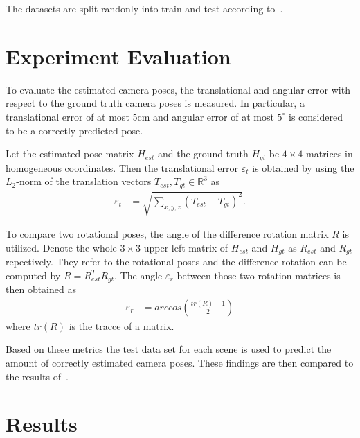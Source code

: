 \documentclass[final]{cvpr}
\begin{document}
The datasets are split randonly into train and test according to~\cite[Table 1]{shotton2013}. 

\section{Experiment Evaluation}
To evaluate the estimated camera poses, the translational and angular error with respect to the 
ground truth camera poses is measured. In particular, a translational error of at 
most $5$cm and angular error of at most $5^{\circ}$ is considered to be a correctly predicted pose. 

Let the estimated pose matrix $H_{est}$ and the ground truth $H_{gt}$ be $4 \times 4$ matrices
in homogeneous coordinates. Then the translational error $\varepsilon_t$ is obtained by using the 
$L_2$-norm of the translation vectors $T_{est}, T_{gt} \in \mathbb{R}^3$ as 
\begin{align}
    \varepsilon_t &= \sqrt{\sum_{x,y,z}(T_{est} - T_{gt})^2}.
\end{align}

To compare two rotational poses, the angle of the difference rotation matrix $R$ is utilized. 
Denote the whole $3\times3$ upper-left matrix of $H_{est}$ and $H_{gt}$ as $R_{est}$ and 
$R_{gt}$ repectively. They refer to the rotational poses and the difference rotation can be computed 
by $R = R_{est}^TR_{gt}$. The angle $\varepsilon_r$ between those two rotation matrices is then obtained as
\begin{align}
    \varepsilon_r &= arccos \left( \frac{tr(R)-1}{2} \right)
\end{align}
where $tr(R)$ is the tracce of a matrix.

Based on these metrics the test data set for each scene is used to predict the amount of correctly 
estimated camera poses. These findings are then compared to the results of~\cite{shotton2013}.


\section{Results}


{\small


}
\end{document}

